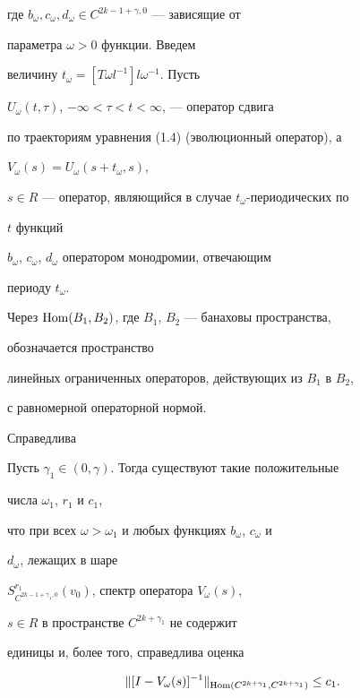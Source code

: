где $b_\omega,c_\omega,d_\omega\in C^{2k-1+\gamma,0}$ --- зависящие от 


параметра $\omega>0$ функции. Введем 


величину $t_\omega=[T\omega l^{-1}]l\omega^{-1}$. Пусть 


$U_\omega(t,\tau)$, $-\infty<\tau<t<\infty$, --- оператор сдвига 


по траекториям уравнения (1.4) (эволюционный оператор), а 


$V_\omega(s)=U_\omega(s+t_\omega,s)$, 


$s\in R$ --- оператор, являющийся в случае $t_\omega$-периодических по 


$t$ функций 


$b_\omega$, $c_\omega$, $d_\omega$ оператором монодромии, отвечающим 


периоду $t_\omega$. 


Через $\operatorname{Hom}(B_1,B_2)$, где $B_1$, $B_2$ --- банаховы пространства, 


обозначается пространство 


линейных ограниченных операторов, действующих из $B_1$ в $B_2$,


с равномерной операторной нормой. 


 


Справедлива 


 


\begin{lemnonum} 


Пусть $\gamma_1\in(0,\gamma)$. Тогда существуют такие положительные 


числа $\omega_1$, $r_1$ и $c_1$, 


что при всех $\omega>\omega_1$ и любых функциях $b_\omega$, $c_\omega$ и 


$d_\omega$, лежащих в шаре 


$S^{r_1}_{C^{2k-1+\gamma_1,0}}(v_0)$, спектр оператора $V_\omega(s)$, 


$s\in R$ в пространстве $C^{2k+\gamma_1}$ не содержит 


единицы и, более того, справедлива оценка 


$$ 


\|[I-V_\omega(s)]^{-1}\|_{\Hom(C^{2k+\gamma_1},C^{2k+\gamma_1})} 


\le c_1. 


$$ 


\end{lemnonum} 


